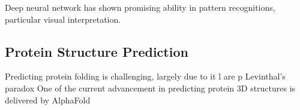 Deep neural network has shown promising ability in pattern recognitions, particular visual interpretation.
\par 

\subsection{Protein Structure Prediction}
Predicting protein folding is challenging, largely due to it l are p Levinthal's paradox One of the current advancement in predicting protein 3D structures is delivered by AlphaFold